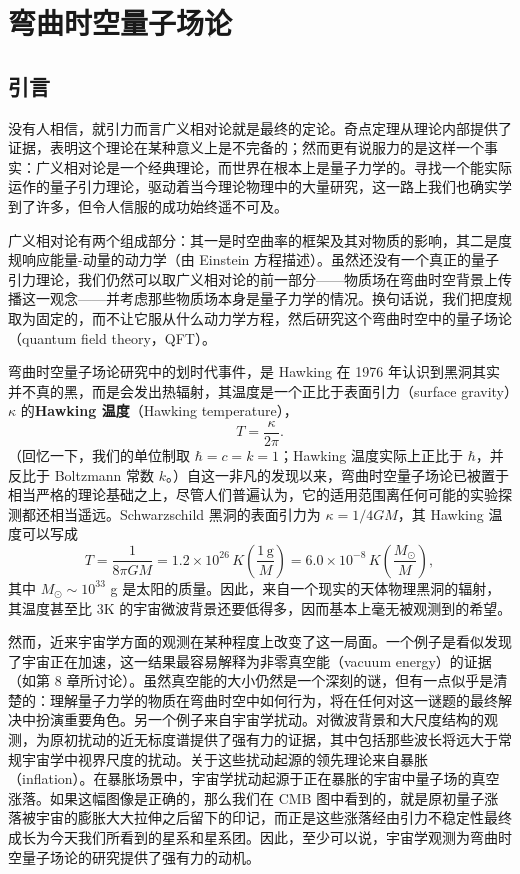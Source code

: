 \chapter{弯曲时空量子场论}

\section{引言}

没有人相信，就引力而言广义相对论就是最终的定论。奇点定理从理论内部提供了证据，表明这个理论在某种意义上是不完备的；然而更有说服力的是这样一个事实：广义相对论是一个经典理论，而世界在根本上是量子力学的。寻找一个能实际运作的量子引力理论，驱动着当今理论物理中的大量研究，这一路上我们也确实学到了许多，但令人信服的成功始终遥不可及。

广义相对论有两个组成部分：其一是时空曲率的框架及其对物质的影响，其二是度规响应能量-动量的动力学（由 Einstein 方程描述）。虽然还没有一个真正的量子引力理论，我们仍然可以取广义相对论的前一部分——物质场在弯曲时空背景上传播这一观念——并考虑那些物质场本身是量子力学的情况。换句话说，我们把度规取为固定的，而不让它服从什么动力学方程，然后研究这个弯曲时空中的量子场论（quantum field theory，QFT）。

弯曲时空量子场论研究中的划时代事件，是 Hawking 在 1976 年认识到黑洞其实并不真的黑，而是会发出热辐射，其温度是一个正比于表面引力（surface gravity）$\kappa$ 的\textbf{Hawking 温度}（Hawking temperature），
\begin{equation*}
\boxed{\;T = \frac{\kappa}{2\pi}.\;}\tag{9.1}
\end{equation*}
（回忆一下，我们的单位制取 $\hbar = c = k = 1$；Hawking 温度实际上正比于 $\hbar$，并反比于 Boltzmann 常数 $k$。）自这一非凡的发现以来，弯曲时空量子场论已被置于相当严格的理论基础之上，尽管人们普遍认为，它的适用范围离任何可能的实验探测都还相当遥远。Schwarzschild 黑洞的表面引力为 $\kappa = 1/4GM$，其 Hawking 温度可以写成
\begin{equation*}
T = \frac{1}{8\pi GM} = 1.2\times 10^{26}\,K\left(\frac{1\,\mathrm{g}}{M}\right) = 6.0\times 10^{-8}\,K\left(\frac{M_\odot}{M}\right),
\tag{9.2}
\end{equation*}
其中 $M_\odot \sim 10^{33}$ g 是太阳的质量。因此，来自一个现实的天体物理黑洞的辐射，其温度甚至比 3K 的宇宙微波背景还要低得多，因而基本上毫无被观测到的希望。

然而，近来宇宙学方面的观测在某种程度上改变了这一局面。一个例子是看似发现了宇宙正在加速，这一结果最容易解释为非零真空能（vacuum energy）的证据（如第 8 章所讨论）。虽然真空能的大小仍然是一个深刻的谜，但有一点似乎是清楚的：理解量子力学的物质在弯曲时空中如何行为，将在任何对这一谜题的最终解决中扮演重要角色。另一个例子来自宇宙学扰动。对微波背景和大尺度结构的观测，为原初扰动的近无标度谱提供了强有力的证据，其中包括那些波长将远大于常规宇宙学中视界尺度的扰动。关于这些扰动起源的领先理论来自暴胀（inflation）。在暴胀场景中，宇宙学扰动起源于正在暴胀的宇宙中量子场的真空涨落。如果这幅图像是正确的，那么我们在 CMB 图中看到的，就是原初量子涨落被宇宙的膨胀大大拉伸之后留下的印记，而正是这些涨落经由引力不稳定性最终成长为今天我们所看到的星系和星系团。因此，至少可以说，宇宙学观测为弯曲时空量子场论的研究提供了强有力的动机。

